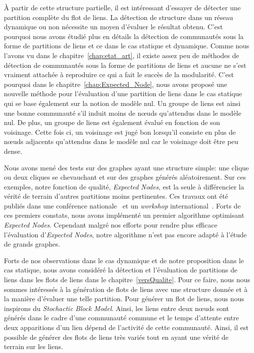 \bigskip

\`A partir de cette structure partielle, il est intéressant d'essayer de détecter une partition complète du flot de liens.
La détection de structure dans un réseau dynamique ou non nécessite un moyen d'évaluer le résultat obtenu.
C'est pourquoi nous avons étudié plus en détails la détection de communautés sous la forme de partitions de liens et ce dans le cas statique et dynamique.
Comme nous l'avons vu dans le chapitre~\ref{chap:etat_art}, il existe assez peu de méthodes de détection de communautés sous la forme de partitions de liens et aucune ne s'est vraiment attachée à reproduire ce qui a fait le succès de la modularité.
C'est pourquoi dans le chapitre~\ref{chap:Expected_Node}, nous avons proposé une nouvelle méthode pour l'évaluation d'une partition de liens dans le cas statique qui se base également sur la notion de modèle nul.
Un groupe de liens est ainsi une bonne communauté s'il induit moins de n\oe{}uds qu'attendus dans le modèle nul.
De plus, un groupe de liens est également évalué en fonction de son voisinage.
Cette fois ci, un voisinage est jugé bon lorsqu'il consiste en plus de n\oe{}uds adjacents qu'attendus dans le modèle nul car le voisinage doit être peu dense.

Nous avons mené des tests sur des graphes ayant une structure simple: une clique ou deux cliques se chevauchant et sur des graphes générés aléatoirement.
Sur ces exemples, notre fonction de qualité, \emph{Expected} \emph{Nodes}, est la seule à différencier la vérité de terrain d'autres partitions moins pertinentes.
Ces travaux ont été publiés dans une conférence nationale~\cite{Gaumont2014} et un \emph{workshop} international~\cite{Gaumont2015}.
Forts de ces premiers constats, nous avons implémenté un premier algorithme optimisant \emph{Expected Nodes}.
Cependant malgré nos efforts pour rendre plus efficace l'évaluation d'\emph{Expected Nodes}, notre algorithme n'est pas encore adapté à l'étude de grands graphes.

\bigskip

Forts de nos observations dans le cas dynamique et de notre proposition dans le cas statique, nous avons considéré la détection et l'évaluation de partitions de liens dans les flots de liens dans le chapitre~\ref{versQualite}.
Pour ce faire, nous nous sommes intéressés à la génération de flots de liens avec une structure donnée et à la manière d'évaluer une telle partition.
Pour générer un flot de liens, nous nous inspirons du \emph{Stochactic Block Model}.
Ainsi, les liens entre deux n\oe{}uds sont générés dans le cadre d'une communauté commune et le temps d'attente entre deux apparitions d'un lien dépend de l'activité de cette communauté.
Ainsi, il est possible de générer des flots de liens très variés tout en ayant une vérité de terrain sur les liens.

